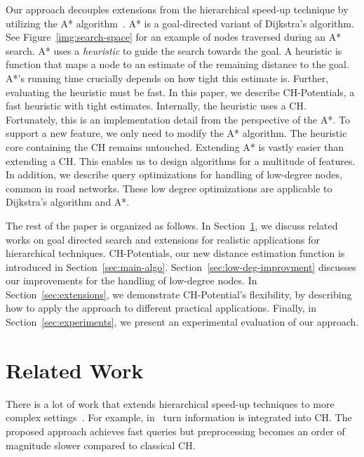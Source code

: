 \documentclass[a4paper,UKenglish,cleveref, autoref, thm-restate]{lipics-v2021}
\begin{document}
Our approach decouples extensions from the hierarchical speed-up technique by utilizing the A* algorithm~\cite{hnr-afbhd-68}.
A* is a goal-directed variant of Dijkstra's algorithm.
See Figure~\ref{img:search-space} for an example of nodes traversed during an A* search.
A* uses a \emph{heuristic} to guide the search towards the goal.
A heuristic is function that maps a node to an estimate of the remaining distance to the goal.
A*'s running time crucially depends on how tight this estimate is.
Further, evaluating the heuristic must be fast.
In this paper, we describe CH-Potentials, a fast heuristic with tight estimates.
Internally, the heuristic uses a CH.
Fortunately, this is an implementation detail from the perspective of the A*.
To support a new feature, we only need to modify the A* algorithm.
The heuristic core containing the CH remains untouched.
Extending A* is vastly easier than extending a CH.
This enables us to design algorithms for a multitude of features.
In addition, we describe query optimizations for handling of low-degree nodes, common in road networks.
These low degree optimizations are applicable to Dijkstra's algorithm and A*.

The rest of the paper is organized as follows.
In Section~\ref{sec:related_work}, we discuss related works on goal directed search and extensions for realistic applications for hierarchical techniques.
CH-Potentials, our new distance estimation function is introduced in Section~\ref{sec:main-algo}.
Section~\ref{sec:low-deg-improvment} discusses our improvements for the handling of low-degree nodes.
In Section~\ref{sec:extensions}, we demonstrate CH-Potential's flexibility, by describing how to apply the approach to different practical applications.
Finally, in Section~\ref{sec:experiments}, we present an experimental evaluation of our approach.

\section{Related Work}\label{sec:related_work}

There is a lot of work that extends hierarchical speed-up techniques to more complex settings~\cite{bdgmpsww-rptn-16}.
For example, in~\cite{gv-errnt-11} turn information is integrated into CH.
The proposed approach achieves fast queries but preprocessing becomes an order of magnitude slower compared to classical CH.
\end{document}
